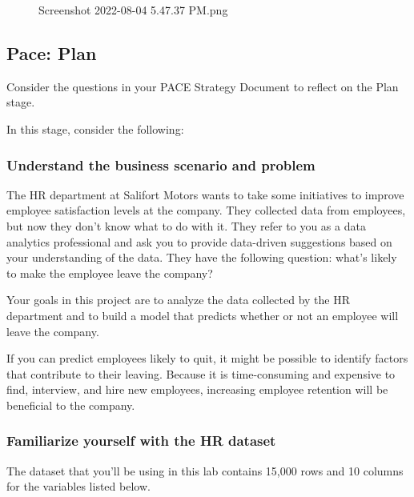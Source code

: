 \documentclass[11pt]{article}
\begin{document}
    \begin{figure}
\centering
\caption{Screenshot 2022-08-04 5.47.37 PM.png}
\end{figure}

    \hypertarget{pace-plan}{%
\subsection{\texorpdfstring{\textbf{Pace:
Plan}}{Pace: Plan}}\label{pace-plan}}

Consider the questions in your PACE Strategy Document to reflect on the
Plan stage.

In this stage, consider the following:

    \hypertarget{understand-the-business-scenario-and-problem}{%
\subsubsection{Understand the business scenario and
problem}\label{understand-the-business-scenario-and-problem}}

The HR department at Salifort Motors wants to take some initiatives to
improve employee satisfaction levels at the company. They collected data
from employees, but now they don't know what to do with it. They refer
to you as a data analytics professional and ask you to provide
data-driven suggestions based on your understanding of the data. They
have the following question: what's likely to make the employee leave
the company?

Your goals in this project are to analyze the data collected by the HR
department and to build a model that predicts whether or not an employee
will leave the company.

If you can predict employees likely to quit, it might be possible to
identify factors that contribute to their leaving. Because it is
time-consuming and expensive to find, interview, and hire new employees,
increasing employee retention will be beneficial to the company.

    \hypertarget{familiarize-yourself-with-the-hr-dataset}{%
\subsubsection{Familiarize yourself with the HR
dataset}\label{familiarize-yourself-with-the-hr-dataset}}

The dataset that you'll be using in this lab contains 15,000 rows and 10
columns for the variables listed below.
\end{document}
